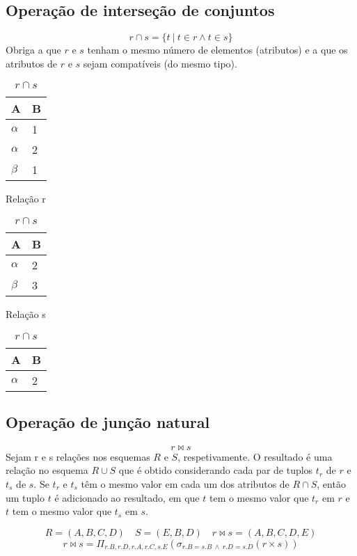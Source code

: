 \documentclass{article}
\begin{document}
\subsection{Operação de interseção de conjuntos}
\[
  r \cap s = \{t \ | \ t \in r \wedge t \in s\}
\]
Obriga a que $r$ e $s$ tenham o mesmo número de elementos (atributos) e a que os atributos de $r$ e $s$ sejam compatíveis (do mesmo tipo).

\begin{table}[ht]
  \parbox{.30\linewidth}{
    \centering
    \begin{tabular}{|l|l|}
      \hline
      A        & B \\ \hline
      $\alpha$ & 1 \\ \hline
      $\alpha$ & 2 \\ \hline
      $\beta$  & 1 \\ \hline
    \end{tabular}
    \caption{Relação r}
  }
  \hfill
  \parbox{.30\linewidth}{
    \centering
    \begin{tabular}{|l|l|}
      \hline
      A        & B \\ \hline
      $\alpha$ & 2 \\ \hline
      $\beta$  & 3 \\ \hline
    \end{tabular}
    \caption{Relação s}
  }
  \hfill
  \parbox{.30\linewidth}{
    \centering
    \begin{tabular}{|l|l|}
      \hline
      A        & B \\ \hline
      $\alpha$ & 2 \\ \hline
    \end{tabular}
    \caption{$r \cap s$}
  }
\end{table}

\subsection{Operação de junção natural}
\[
  r \Join s
\]
Sejam r e s relações nos esquemas $R$ e $S$, respetivamente. O resultado é uma relação no esquema $R \cup S$ que é obtido considerando cada par de tuplos $t_r$ de $r$ e $t_s$ de $s$. Se $t_r$ e $t_s$ têm o mesmo valor em cada um dos atributos de $R \cap S$, então um tuplo $t$ é adicionado ao resultado, em que $t$ tem o mesmo valor que $t_r$ em $r$ e $t$ tem o mesmo valor que $t_s$ em $s$.
\pagebreak

\[
  R = (A,B,C,D) \quad S = (E,B,D) \quad r \Join s=(A,B,C,D,E)
\]
\[
  r \Join s = \Pi_{r.B,r.D,r.A,r.C,s.E}(\sigma_{r.B = s.B \ \wedge \ r.D = s.D}(r \times s))
\]
\end{document}
